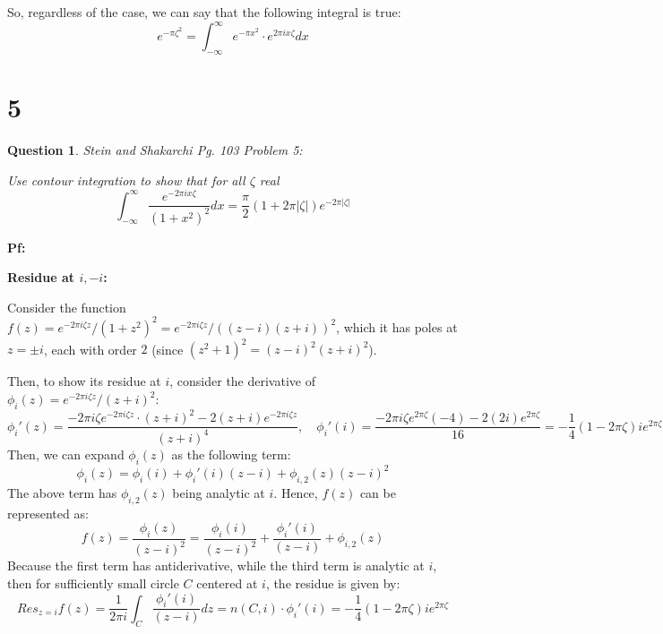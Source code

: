 \documentclass{article}
\newtheorem{question}{Question}
\begin{document}
\hfil

So, regardless of the case, we can say that the following integral is true:
$$e^{-\pi \zeta^2} = \int_{-\infty}^{\infty}e^{-\pi x^2}\cdot e^{2\pi ix\zeta}dx$$

\break

\section*{5}
\begin{myBox}[]{}
    \begin{question}
        Stein and Shakarchi Pg. 103 Problem 5:

        Use contour integration to show that for all $\zeta$ real
        $$\int_{-\infty}^{\infty}\frac{e^{-2\pi ix\zeta}}{(1+x^2)^2}dx = \frac{\pi}{2}(1+2\pi |\zeta|)e^{-2\pi |\zeta|}$$
    \end{question}
\end{myBox}

\textbf{Pf:}

\textbf{Residue at $i,-i$:}

Consider the function $f(z)=e^{-2\pi i\zeta z}/(1+z^2)^2 = e^{-2\pi i\zeta z}/((z-i)(z+i))^2$, which it has poles at $z=\pm i$, each with order $2$ (since $(z^2+1)^2=(z-i)^2(z+i)^2$).

Then, to show its residue at $i$, consider the derivative of $\phi_i(z)=e^{-2\pi i\zeta z}/(z+i)^2$:
$$\phi_i'(z) = \frac{-2\pi i\zeta e^{-2\pi i\zeta z}\cdot (z+i)^2-2(z+i)e^{-2\pi i\zeta z}}{(z+i)^4}, \quad\phi_i'(i)=\frac{-2\pi i\zeta e^{2\pi \zeta}(-4)-2(2i)e^{2\pi \zeta}}{16} = -\frac{1}{4}(1-2\pi \zeta)ie^{2\pi \zeta}$$
Then, we can expand $\phi_i(z)$ as the following term:
$$\phi_i(z) = \phi_i(i)+\phi_i'(i)(z-i)+\phi_{i,2}(z)(z-i)^2$$
The above term has $\phi_{i,2}(z)$ being analytic at $i$. Hence, $f(z)$ can be represented as:
$$f(z)=\frac{\phi_i(z)}{(z-i)^2}=\frac{\phi_i(i)}{(z-i)^2}+\frac{\phi_i'(i)}{(z-i)}+\phi_{i,2}(z)$$
Because the first term has antiderivative, while the third term is analytic at $i$, then for sufficiently small circle $C$ centered at $i$, the residue is given by:
$$Res_{z=i}f(z)=\frac{1}{2\pi i}\int_{C}\frac{\phi_i'(i)}{(z-i)}dz = n(C,i)\cdot \phi_i'(i) = -\frac{1}{4}(1-2\pi \zeta)ie^{2\pi \zeta}$$

\hfil
\end{document}
